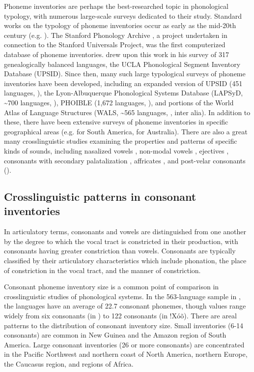   Phoneme inventories are perhaps the best-researched topic in phonological typology, with numerous large-scale surveys dedicated to their study. Standard works on the typology of phoneme inventories occur as early as the mid-20th century (e.g. \citealt{Hockett1955}). The Stanford Phonology Archive \citep{CrothersEtAl1979}, a project undertaken in connection to the Stanford Universals Project, was the first computerized database of phoneme inventories. \citet{Maddieson1984} drew upon this work in his survey of 317 genealogically balanced languages, the UCLA Phonological Segment Inventory Database (UPSID). Since then, many such large typological surveys of phoneme inventories have been developed, including an expanded version of UPSID (451 languages, \citealt{MaddiesonPrecoda1992}), the Lyon-Albuquerque Phonological Systems Database (LAPSyD, {\textasciitilde}700 languages, \citealt{MaddiesonEtAl2013}), PHOIBLE (1,672 languages, \citealt{MoranEtAl2014}), and portions of the World Atlas of Language Structures (WALS, {\textasciitilde}565 languages, \citealt{Maddieson2013b,Maddieson2013c}, inter alia). In addition to these, there have been extensive surveys of phoneme inventories in specific geographical areas (e.g. \citealt{MichaelEtAl2015} for South America, \citealt{GasserBowern2014} for Australia). There are also a great many crosslinguistic studies examining the properties and patterns of specific kinds of sounds, including nasalized vowels \citep{Hajek2013}, non-modal vowels \citep{Gordon1998}, ejectives \citep{Fallon2002}, consonants with secondary palatalization \citep{Hall2000}, affricates \citep{Berns2013}, and post-velar consonants (\citealt{Sylak-Glassman2014}). 

\subsection{Crosslinguistic patterns in consonant inventories}\label{sec:4.1.1}

  In articulatory terms, consonants and vowels are distinguished from one another by the degree to which the vocal tract is constricted in their production, with consonants having greater constriction than vowels. Consonants are typically classified by their articulatory characteristics which include phonation, the place of constriction in the vocal tract, and the manner of constriction.

  Consonant phoneme inventory size is a common point of comparison in cross\-linguistic studies of phonological systems. In the 563-language sample in \citet{Maddieson2013b}, the languages have an average of 22.7 consonant phonemes, though values range widely from six consonants (in ) to 122 consonants (in !Xóõ). There are areal patterns to the distribution of consonant inventory size. Small inventories (6-14 consonants) are common in New Guinea and the Amazon region of South America. Large consonant inventories (26 or more consonants) are concentrated in the Pacific Northwest and northern coast of North America, northern Europe, the Caucasus region, and regions of  Africa.

